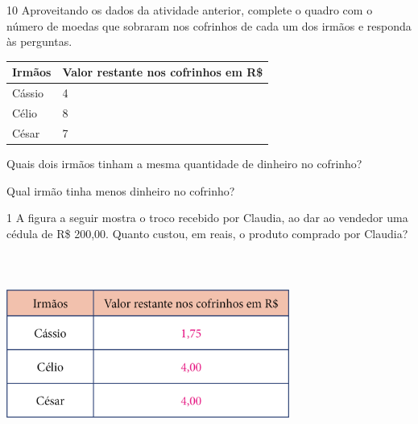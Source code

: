 
\num{10} Aproveitando os dados da atividade anterior, complete o quadro com o número de moedas que sobraram nos cofrinhos de cada um dos irmãos e responda às perguntas.

\begin{longtable}[]{@{}ll@{}}
\toprule
Irmãos & Valor restante nos cofrinhos em R\$\tabularnewline
\midrule
\endhead
Cássio & 4\tabularnewline
Célio & 8\tabularnewline
César & 7\tabularnewline
\bottomrule
\end{longtable}

\begin{escolha}
\item Quais dois irmãos tinham a mesma quantidade de dinheiro no cofrinho?


\item Qual irmão tinha menos dinheiro no cofrinho?

\end{escolha}


\num{1} A figura a seguir mostra o troco recebido por Claudia, ao dar ao vendedor
uma cédula de R\$ 200,00. Quanto custou, em reais, o produto comprado por Claudia?


\includegraphics[width=3.65497in,height=2.60417in]{media/image77.png}

